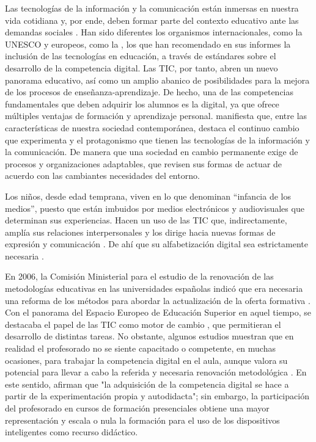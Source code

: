 \documentclass{textolivre}
\begin{document}
Las tecnologías de la información y la comunicación están inmersas en nuestra vida cotidiana y, por ende, deben formar parte del contexto educativo ante las demandas sociales \cite{gutierrez_fresned_mejora_2016}. Han sido diferentes los organismos internacionales, como la UNESCO \cite{unesco2010} y europeos, como la \textcite{comisioneuropea2013}, los que han recomendado en sus informes la inclusión de las tecnologías en educación, a través de estándares sobre el desarrollo de la competencia digital. Las TIC, por tanto, abren un nuevo panorama educativo, así como un amplio abanico de posibilidades para la mejora de los procesos de enseñanza-aprendizaje. De hecho, una de las competencias fundamentales que deben adquirir los alumnos es la digital, ya que ofrece múltiples ventajas de formación y aprendizaje personal. \textcite{gairin_sallan_cambio_2009} manifiesta que, entre las características de nuestra sociedad contemporánea, destaca el continuo cambio que experimenta y el protagonismo que tienen las tecnologías de la información y la comunicación. De manera que una sociedad en cambio permanente exige de procesos y organizaciones adaptables, que revisen sus formas de actuar de acuerdo con las cambiantes necesidades del entorno.

Los niños, desde edad temprana, viven en lo que \textcite[p. 6]{sara_malo_2010} denominan “infancia de los medios”, puesto que están imbuidos por medios electrónicos y audiovisuales que determinan sus experiencias. Hacen un uso de las TIC que, indirectamente, amplía sus relaciones interpersonales y los dirige hacia nuevas formas de expresión y comunicación \cite{ortega-ruiz_towards_2014}. De ahí que su alfabetización digital sea estrictamente necesaria \cite{berzosa_ramos_tic_2015}. 

En 2006, la Comisión Ministerial para el estudio de la renovación de las metodologías educativas en las universidades españolas indicó que era necesaria una reforma de los métodos para abordar la actualización de la oferta formativa \cite{ministerio_de_educación_ciencia_2006}. Con el panorama del Espacio Europeo de Educación Superior en aquel tiempo, se destacaba el papel de las TIC como motor de cambio \cite{carrasco_pradas_tic_2005}, que permitieran el desarrollo de distintas tareas. No obstante, algunos estudios \cite{carrera_farran_identificacion_2012} muestran que en realidad el profesorado no se siente capacitado o competente, en muchas ocasiones, para trabajar la competencia digital en el aula, aunque valora su potencial para llevar a cabo la referida y necesaria renovación metodológica \cite{prendes_espinosa_competencias_2013}. En este sentido, \textcite[p. 1489]{agreda_montoro_formacion_2016} afirman que "la adquisición de la competencia digital se hace a partir de la experimentación propia y autodidacta"; sin embargo, la participación del profesorado en cursos de formación presenciales obtiene una mayor representación y escala o nula la formación para el uso de los dispositivos inteligentes como recurso didáctico. 
\end{document}
